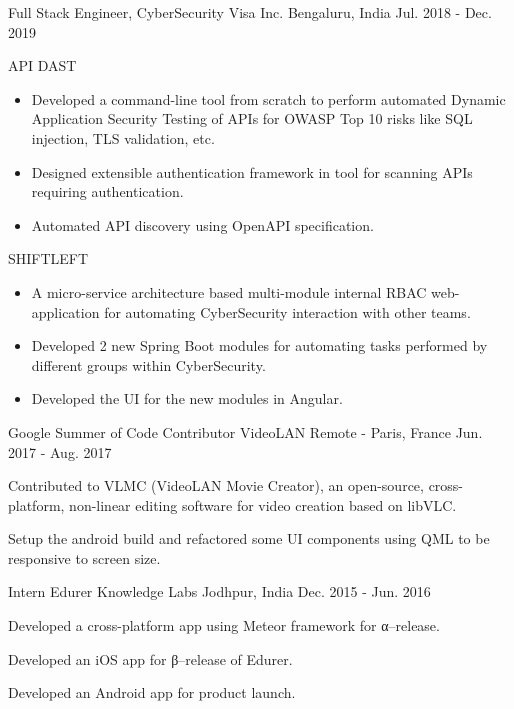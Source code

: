 \begin{cventries}
  \cventry
    {Full Stack Engineer, CyberSecurity} %
    {Visa Inc.} %
    {Bengaluru, India} %
    {Jul. 2018 - Dec. 2019} %
    {
      \begin{cvitems} %
        \item {API DAST}
	  \begin{itemize}
	    \item {Developed a command-line tool from scratch to perform automated Dynamic Application Security Testing of APIs for OWASP Top 10 risks like SQL injection, TLS validation, etc.}
	    \item {Designed extensible authentication framework in tool for scanning APIs requiring authentication.}
	    \item {Automated API discovery using OpenAPI specification.}
	  \end{itemize}
        \item {SHIFTLEFT}
	  \begin{itemize}
	    \item {A micro-service architecture based multi-module internal RBAC web-application for automating CyberSecurity interaction with other teams.}
	    \item {Developed 2 new Spring Boot modules for automating tasks performed by different groups within CyberSecurity.}
	    \item {Developed the UI for the new modules in Angular.}
	  \end{itemize}
      \end{cvitems}
    }

  \cventry
    {Google Summer of Code Contributor} %
    {VideoLAN} %
    {Remote - Paris, France} %
    {Jun. 2017 - Aug. 2017} %
    {
      \begin{cvitems} %
        \item {Contributed to VLMC (VideoLAN Movie Creator), an open-source, cross-platform, non-linear editing software for video creation based on libVLC.}
	\item {Setup the android build and refactored some UI components using QML to be responsive to screen size.}
      \end{cvitems}
    }

  \cventry
    {Intern} %
    {Edurer Knowledge Labs} %
    {Jodhpur, India} %
    {Dec. 2015 - Jun. 2016} %
    {
      \begin{cvitems} %
        \item {Developed a cross-platform app using Meteor framework for α–release.}
	\item {Developed an iOS app for β–release of Edurer.}
	\item {Developed an Android app for product launch.}
      \end{cvitems}
    }

\end{cventries}
